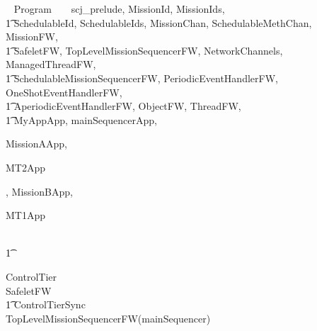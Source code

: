 
%
\begin{zsection}
  \SECTION ~ Program ~ \parents ~ scj\_prelude, MissionId, MissionIds, \\
  \t1 SchedulableId, SchedulableIds, MissionChan, SchedulableMethChan, MissionFW,\\
  \t1 SafeletFW, TopLevelMissionSequencerFW, NetworkChannels, ManagedThreadFW, \\
  \t1 SchedulableMissionSequencerFW, PeriodicEventHandlerFW, OneShotEventHandlerFW,\\
  \t1 AperiodicEventHandlerFW, ObjectFW, ThreadFW, \\
  \t1 MyAppApp, mainSequencerApp,

MissionAApp,

MT2App
	
	,
MissionBApp,

MT1App
	
\\ \t1
	
	
\end{zsection}
%
\begin{circus}
\circprocess ControlTier \circdef \\
\circblockopen
SafeletFW \\
\t1 \lpar ControlTierSync \rpar \\
TopLevelMissionSequencerFW(mainSequencer)
\circblockclose
\end{circus}
%


